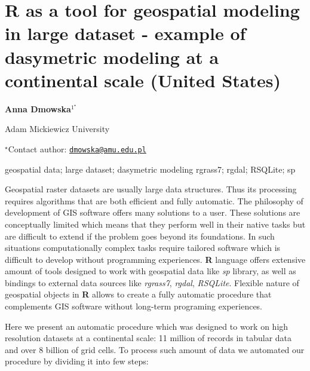 \documentclass[\main/boa.tex]{subfiles}
\begin{document}
\section{R as a tool for geospatial modeling in large dataset - example of
dasymetric modeling at a continental scale (United States)}

\begin{center}
  {\bf Anna Dmowska$^{1^\star}$}
\end{center}

\vskip 0.3cm

\begin{affiliations}
\begin{enumerate}
\begin{minipage}{0.915\textwidth}
\centering
\item Adam Mickiewicz University \\[-2pt]
\end{minipage}
\end{enumerate}
$^\star$Contact author: \href{mailto:dmowska@amu.edu.pl}{\nolinkurl{dmowska@amu.edu.pl}}\\
\end{affiliations}

\vskip 0.5cm

\begin{minipage}{0.915\textwidth}
\keywords geospatial data; large dataset; dasymetric modeling
\packages rgrass7; rgdal; RSQLite; sp
\end{minipage}

\vskip 0.8cm

Geospatial raster datasets are usually large data structures. Thus its
processing requires algorithms that are both efficient and fully
automatic. The philosophy of development of GIS software offers many
solutions to a user. These solutions are conceptually limited which
means that they perform well in their native tasks but are difficult to
extend if the problem goes beyond its foundations. In such situations
computationally complex tasks require tailored software which is
difficult to develop without programming experiences. \textbf{R}
language offers extensive amount of tools designed to work with
geospatial data like \emph{sp} library, as well as bindings to external
data sources like \emph{rgrass7}, \emph{rgdal}, \emph{RSQLite}. Flexible
nature of geospatial objects in \textbf{R} allows to create a fully
automatic procedure that complements GIS software without long-term
programing experiences.

Here we present an automatic procedure which was designed to work on
high resolution datasets at a continental scale: 11 million of records
in tabular data and over 8 billion of grid cells. To process such amount
of data we automated our procedure by dividing it into few steps:
\end{document}
